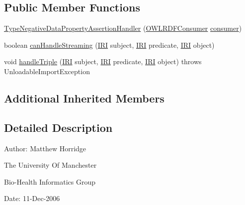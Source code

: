 \subsection*{Public Member Functions}
\begin{DoxyCompactItemize}
\item 
\hyperlink{classorg_1_1coode_1_1owlapi_1_1rdfxml_1_1parser_1_1_type_negative_data_property_assertion_handler_a65a9fb2ffa449d54b4e464531cde3332}{Type\-Negative\-Data\-Property\-Assertion\-Handler} (\hyperlink{classorg_1_1coode_1_1owlapi_1_1rdfxml_1_1parser_1_1_o_w_l_r_d_f_consumer}{O\-W\-L\-R\-D\-F\-Consumer} \hyperlink{classorg_1_1coode_1_1owlapi_1_1rdfxml_1_1parser_1_1_abstract_triple_handler_a4ccf4d898ff01eb1cadfa04b23d54e9c}{consumer})
\item 
boolean \hyperlink{classorg_1_1coode_1_1owlapi_1_1rdfxml_1_1parser_1_1_type_negative_data_property_assertion_handler_a480270a4dbc92ff937019cfe9599f72a}{can\-Handle\-Streaming} (\hyperlink{classorg_1_1semanticweb_1_1owlapi_1_1model_1_1_i_r_i}{I\-R\-I} subject, \hyperlink{classorg_1_1semanticweb_1_1owlapi_1_1model_1_1_i_r_i}{I\-R\-I} predicate, \hyperlink{classorg_1_1semanticweb_1_1owlapi_1_1model_1_1_i_r_i}{I\-R\-I} object)
\item 
void \hyperlink{classorg_1_1coode_1_1owlapi_1_1rdfxml_1_1parser_1_1_type_negative_data_property_assertion_handler_ad85b3480ba7c9998a817113a9e79bc8b}{handle\-Triple} (\hyperlink{classorg_1_1semanticweb_1_1owlapi_1_1model_1_1_i_r_i}{I\-R\-I} subject, \hyperlink{classorg_1_1semanticweb_1_1owlapi_1_1model_1_1_i_r_i}{I\-R\-I} predicate, \hyperlink{classorg_1_1semanticweb_1_1owlapi_1_1model_1_1_i_r_i}{I\-R\-I} object)  throws Unloadable\-Import\-Exception 
\end{DoxyCompactItemize}
\subsection*{Additional Inherited Members}


\subsection{Detailed Description}
Author\-: Matthew Horridge\par
 The University Of Manchester\par
 Bio-\/\-Health Informatics Group\par
 Date\-: 11-\/\-Dec-\/2006\par
\par
 

